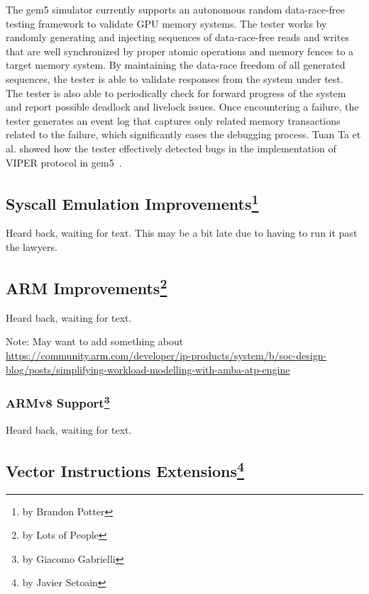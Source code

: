 The gem5 simulator currently supports an autonomous random data-race-free testing framework to validate GPU memory systems.
The tester works by randomly generating and injecting sequences of data-race-free reads and writes that are well synchronized by proper atomic operations and memory fences to a target memory system.
By maintaining the data-race freedom of all generated sequences, the tester is able to validate responses from the system under test.
The tester is also able to periodically check for forward progress of the system and report possible deadlock and livelock issues.
Once encountering a failure, the tester generates an event log that captures only related memory transactions related to the failure, which significantly eases the debugging process.
Tuan Ta et al. showed how the tester effectively detected bugs in the implementation of VIPER protocol in gem5~\cite{Ta2019gputesting}.

\subsection[Syscall Emulation Improvements]{Syscall Emulation Improvements\footnote{by Brandon Potter}}

Heard back, waiting for text.
This may be a bit late due to having to run it past the lawyers.

\subsection[ARM Improvements]{ARM Improvements\footnote{by Lots of People}}

Heard back, waiting for text.

Note: May want to add something about \url{https://community.arm.com/developer/ip-products/system/b/soc-design-blog/posts/simplifying-workload-modelling-with-amba-atp-engine}

\subsubsection[ARMv8 Support]{ARMv8 Support\footnote{by Giacomo Gabrielli}}

Heard back, waiting for text.

\subsection[Vector Instruction Extensions]{Vector Instructions Extensions\footnote{by Javier Setoain}}

